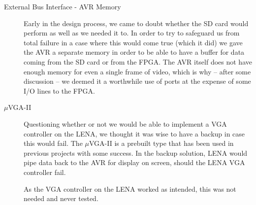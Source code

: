 \begin{description}
\item[External Bus Interface - AVR Memory]  \hfill 

Early in the design process, we came to doubt whether the \ac{SD} card would perform as well as we needed it to. In order to try to safeguard us from total failure in a case where this would come true (which it did) we gave the AVR a separate memory in order to be able to have a buffer for data coming from the \ac{SD} card or from the \ac{FPGA}. The AVR itself does not have enough memory for even a single frame of video, which is why -- after some discussion -- we deemed it a worthwhile use of ports at the expense of some \ac{I/O} lines to the FPGA.

\item[$\mu$VGA-II]  \hfill

Questioning whether or not we would be able to implement a \ac{VGA} controller
on the \ac{LENA}, we thought it was wise to have a backup in case this would fail. The $\mu$VGA-II is a prebuilt type that
has been used in previous projects with some success. In the backup solution, \ac{LENA} 
would pipe data back to the AVR for display on screen, should
the \ac{LENA} \ac{VGA} controller fail.

As the \ac{VGA} controller on the LENA worked as intended, this was not
needed and never tested.

\end{description}
